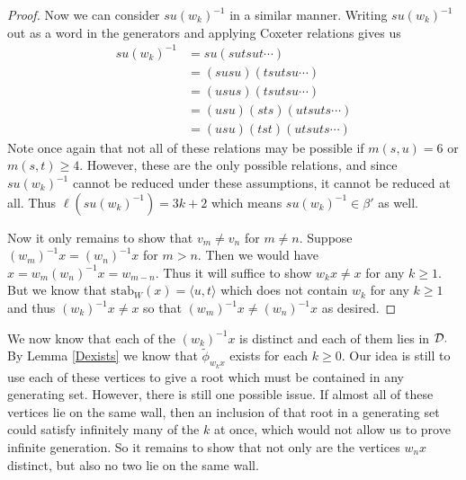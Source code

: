 \documentclass[class=book, crop=false,12 pt]{standalone}
\begin{document}
\begin{proof}
	Now we can consider $su(w_k)^{-1}$ in a similar manner. Writing $su(w_k)^{-1}$ out as a word in the generators and applying Coxeter relations gives us
\begin{align*}
	su(w_k)^{-1}&=su(sutsut\cdots)\\
	     &=(susu)(tsutsu\cdots)\\
	     &=(usus)(tsutsu\cdots)\\
	     &=(usu)(sts)(utsuts\cdots)\\
	     &=(usu)(tst)(utsuts\cdots)
\end{align*}
Note once again that not all of these relations may be possible if $m(s,u)=6$ or $m(s,t)\ge 4.$ However, these are the only possible relations, and since $su(w_k)^{-1}$ cannot be reduced under these assumptions, it cannot be reduced at all. Thus $\ell(su(w_k)^{-1})=3k+2$ which means $su(w_k)^{-1}\in \beta'$ as well.

Now it only remains to show that $v_m\neq v_n$ for $m\neq n.$ Suppose $(w_m)^{-1}x=(w_n)^{-1}x$ for $m>n.$ Then we would have $x=w_m(w_n)^{-1}x=w_{m-n}.$ Thus it will suffice to show $w_kx\neq x$ for any $k\ge 1.$ But we know that $\mathrm{stab}_{W}(x)=\langle u,t \rangle$ which does not contain $w_k$ for any $k\ge 1$ and thus $(w_k)^{-1}x\neq x$ so that $(w_m)^{-1}x\neq (w_n)^{-1}x$ as desired.

\end{proof}

We now know that each of the $(w_k)^{-1}x$ is distinct and each of them lies in $\mathcal{D}.$ By Lemma \ref{Dexists} we know that $\tilde{\phi}_{w_kx}$ exists for each $k\ge 0.$ Our idea is still to use each of these vertices to give a root which must be contained in any generating set. However, there is still one possible issue. If almost all of these vertices lie on the same wall, then an inclusion of that root in a generating set could satisfy infinitely many of the $k$ at once, which would not allow us to prove infinite generation. So it remains to show that not only are the vertices $w_nx$ distinct, but also no two lie on the same wall.
\end{document}
